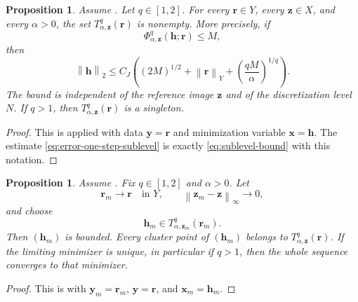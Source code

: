 \documentclass{article}
\newtheorem{proposition}[theorem]{Proposition}
\theoremstyle{remark}
\newcommand{\norm}[1]{\left\lVert #1 \right\rVert}
\newcommand{\bx}{{\bm{x}}}
\newcommand{\by}{{\bm{y}}}
\newcommand{\bz}{{\bm{z}}}
\newcommand{\bh}{{\bm{h}}}
\newcommand{\br}{{\bm{r}}}
\begin{document}
\begin{proposition}\label{prop:error-one-step}
Assume . Let \(q\in[1,2]\). For every
\(\br\in Y\), every \(\bz\in X\), and every \(\alpha>0\), the set
\(T_{\alpha,\bz}^q(\br)\) is nonempty. More precisely, if
\[
\Phi_{\alpha,\bz}^q(\bh;\br)\le M,
\]
then
\begin{equation}\label{eq:error-one-step-sublevel}
\norm{\bh}_2
\le
C_J\left(
(2M)^{1/2}+\norm{\br}_Y
+\left(\frac{qM}{\alpha}\right)^{1/q}
\right).
\end{equation}
The bound is independent of the reference image \(\bz\) and of the
discretization level \(N\). If \(q>1\), then \(T_{\alpha,\bz}^q(\br)\) is a
singleton.
\end{proposition}

\begin{proof}
This is  applied with data \(\by=\br\) and minimization
variable \(\bx=\bh\). The estimate \cref{eq:error-one-step-sublevel} is exactly
\cref{eq:sublevel-bound} with this notation.
\end{proof}

\begin{proposition}\label{prop:error-one-step-stability}
Assume . Fix \(q\in[1,2]\) and \(\alpha>0\). Let
\[
\br_m\to\br \quad\text{in }Y,
\qquad
\norm{\bz_m-\bz}_\infty\to0,
\]
and choose
\[
\bh_m\in T_{\alpha,\bz_m}^q(\br_m).
\]
Then \((\bh_m)\) is bounded. Every cluster point of \((\bh_m)\) belongs to
\(T_{\alpha,\bz}^q(\br)\). If the limiting minimizer is unique, in particular if
\(q>1\), then the whole sequence converges to that minimizer.
\end{proposition}

\begin{proof}
This is  with \(\by_m=\br_m\),
\(\by=\br\), and \(\bx_m=\bh_m\).
\end{proof}
\end{document}
